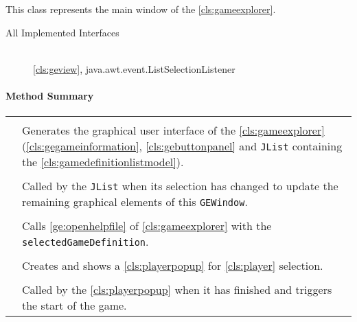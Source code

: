 \pagebreak

This class represents the main window of the \ref{cls:gameexplorer}. \\

\begin{description}
	\item[All Implemented Interfaces] \hfill \\
	\ref{cls:geview}, java.awt.event.ListSelectionListener
\end{description}

\centerdash

\paragraph*{Method Summary}
\paragraph*{}
\begin{longtable}{Lp{10cm}}
	\startmethodtable
	 \\
	& Generates the graphical user interface of the \ref{cls:gameexplorer} (\ref{cls:gegameinformation}, \ref{cls:gebuttonpanel} and \texttt{JList} containing the \ref{cls:gamedefinitionlistmodel}). \\
	 \\
	& Called by the \texttt{JList} when its selection has changed to update the remaining graphical elements of this \texttt{GEWindow}. \\
	 \\
	& Calls \ref{ge:openhelpfile} of \ref{cls:gameexplorer} with the \texttt{selectedGameDefinition}. \\
	 \\
	& Creates and shows a \ref{cls:playerpopup} for \ref{cls:player} selection. \\
	 \\
	& Called by the \ref{cls:playerpopup} when it has finished and triggers the start of the game. \\
	\hline
\end{longtable}

